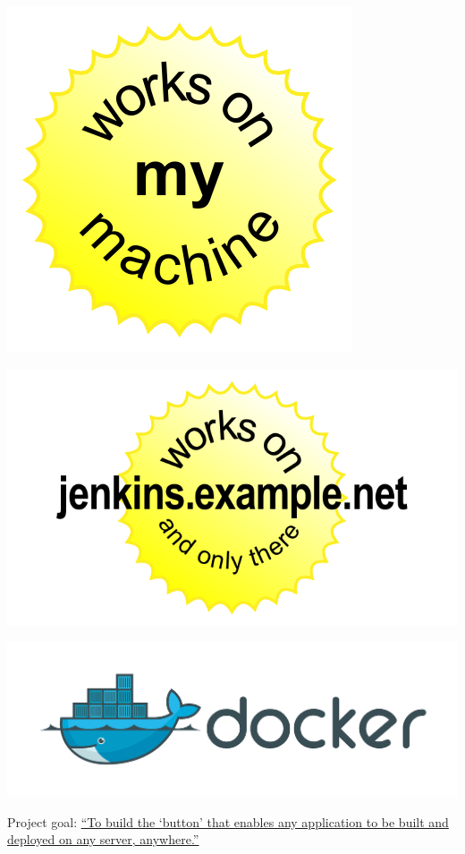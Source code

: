 \documentclass[xcolor=svgnames,17pt]{beamer}
\begin{document}
\begin{frame}[plain]{}
\includegraphics[height=0.95\paperheight,center]{works-on-my-machine.pdf}
\end{frame}

\begin{frame}[plain]{}
\includegraphics[height=0.95\paperheight,center]{works-on-jenkins.pdf}
\end{frame}

\begin{frame}{}
\includegraphics[width=0.95\paperwidth,center]{docker-logo.pdf}
\begin{center}
Project goal: %
\href{https://blog.docker.com/2014/10/docker-microsoft-partner-distributed-applications/}{%
“To build the ‘button’ that enables any application to be built and
deployed on any server, anywhere.”}
\end{center}
\end{frame}
\end{document}
